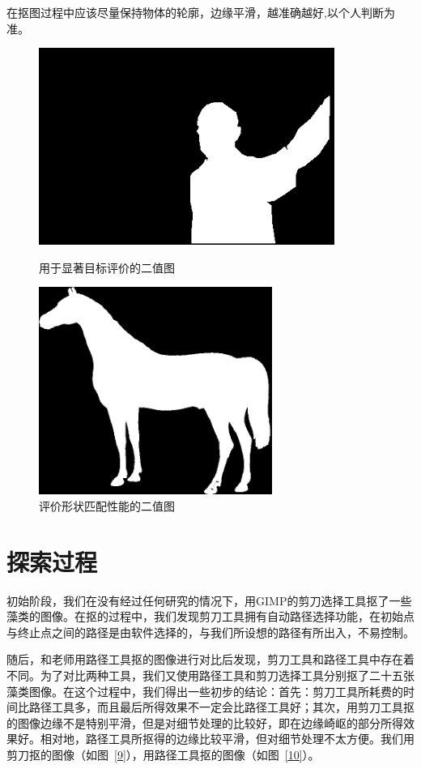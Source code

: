 \documentclass[12pt]{article}
\begin{document}
在抠图过程中应该尽量保持物体的轮廓，边缘平滑，越准确越好,以个人判断为准。

\begin{figure}[htbp]
\begin{minipage}{0.5\textwidth}
\centering
\includegraphics[width=3.8in]{11.png}
\caption{用于显著目标评价的二值图}
\label{6}
\end{minipage}
\begin{minipage}{0.5\textwidth}
\centering
\includegraphics[width=3.0in]{horse.png}
\caption{评价形状匹配性能的二值图}
\label{7}
\end{minipage}
\end{figure}

\section{探索过程}
\hspace{0.3in}初始阶段，我们在没有经过任何研究的情况下，用GIMP的剪刀选择工具抠了一些藻类的图像。在抠的过程中，我们发现剪刀工具拥有自动路径选择功能，在初始点与终止点之间的路径是由软件选择的，与我们所设想的路径有所出入，不易控制。

随后，和老师用路径工具抠的图像进行对比后发现，剪刀工具和路径工具中存在着不同。为了对比两种工具，我们又使用路径工具和剪刀选择工具分别抠了二十五张藻类图像。在这个过程中，我们得出一些初步的结论：首先：剪刀工具所耗费的时间比路径工具多，而且最后所得效果不一定会比路径工具好；其次，用剪刀工具抠的图像边缘不是特别平滑，但是对细节处理的比较好，即在边缘崎岖的部分所得效果好。相对地，路径工具所抠得的边缘比较平滑，但对细节处理不太方便。我们用剪刀抠的图像（如图~\ref{9}），用路径工具抠的图像（如图~\ref{10}）。
\end{document}
